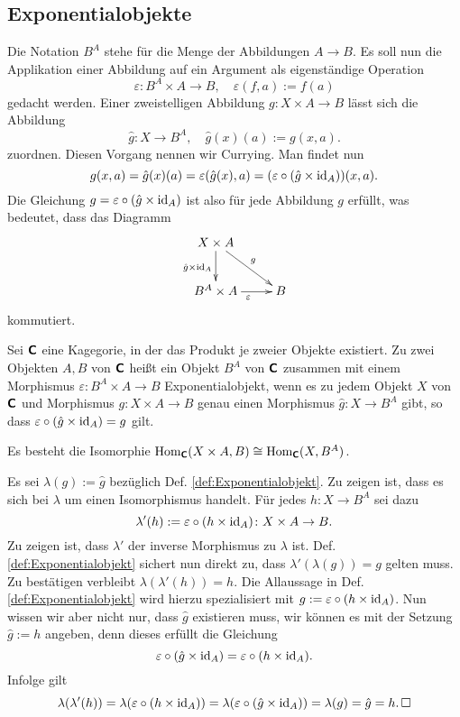 \subsection{Exponentialobjekte}

Die Notation $B^A$ stehe für die Menge der Abbildungen $A\to B$.
Es soll nun die Applikation einer Abbildung auf ein Argument
als eigenständige Operation
\[\varepsilon\colon B^A\times A \to B,\quad
\varepsilon(f,a) := f(a)\]
gedacht werden. Einer zweistelligen Abbildung
$g\colon X\times A\to B$ lässt sich die Abbildung
\[\hat g\colon X\to B^A,\quad \hat g(x)(a) := g(x,a).\]
zuordnen. Diesen Vorgang nennen wir Currying. Man findet nun
\[g(x,a) = \hat g(x)(a) = \varepsilon(\hat g(x),a)
= (\varepsilon\circ (\hat g\times\operatorname{id}_A))(x,a).\]
Die Gleichung $g = \varepsilon\circ(\hat g\times\operatorname{id}_A)$ ist also
für jede Abbildung $g$ erfüllt, was bedeutet, dass das Diagramm
\[\xymatrix{
X\times A\ar[dr]^g\ar[d]_{\hat g\times\id_A} & \\
B^A\times A \ar[r]_{\varepsilon} & B
}\]
kommutiert.

\begin{Definition}[Exponentialobjekt]%
\label{def:Exponentialobjekt}\newlinefirst
Sei $\textsf{\textbf{C}}$ eine Kagegorie, in der das Produkt je zweier Objekte
existiert. Zu zwei Objekten $A,B$ von $\textsf{\textbf{C}}$ heißt ein
Objekt $B^A$ von $\textsf{\textbf{C}}$ zusammen mit einem Morphismus
$\varepsilon\colon B^A\times A\to B$ Exponentialobjekt, wenn es zu jedem
Objekt $X$ von $\textsf{\textbf{C}}$ und Morphismus $g\colon X\times A\to B$
genau einen Morphismus $\hat g\colon X\to B^A$ gibt, so dass
$\varepsilon\circ (\hat g\times\operatorname{id}_A) = g$ gilt.
\end{Definition}

\begin{Satz}\label{Exp-Isomorphie}
Es besteht die Isomorphie
$\operatorname{Hom}_{\textsf{\textbf{C}}}(X\times A, B)\cong\operatorname{Hom}_{\textsf{\textbf{C}}}(X,B^A)$.
\end{Satz}

\noindent{} Es sei $\lambda(g):=\hat g$ bezüglich Def.
\ref{def:Exponentialobjekt}. Zu zeigen ist, dass es sich bei $\lambda$
um einen Isomorphismus handelt. Für jedes $h\colon X\to B^A$ sei dazu
\[\lambda'(h) := \varepsilon\circ (h\times\operatorname{id}_{A})\colon X\times A\to B.\]
Zu zeigen ist, dass $\lambda'$ der inverse Morphismus zu $\lambda$ ist.
Def. \ref{def:Exponentialobjekt} sichert nun direkt zu, dass
$\lambda'(\lambda(g)) = g$ gelten muss. Zu bestätigen verbleibt
$\lambda(\lambda'(h)) = h$. Die Allaussage in Def. \ref{def:Exponentialobjekt}
wird hierzu spezialisiert mit $g:=\varepsilon\circ (h\times\operatorname{id}_A)$.
Nun wissen wir aber nicht nur, dass $\hat g$ existieren muss, wir
können es mit der Setzung $\hat g:=h$ angeben, denn dieses erfüllt die
Gleichung
\[\varepsilon\circ (\hat g\times\operatorname{id}_A) = \varepsilon\circ (h\times\operatorname{id}_A).\]
Infolge gilt
\[\lambda(\lambda'(h)) = \lambda(\varepsilon\circ (h\times\operatorname{id}_A))
= \lambda(\varepsilon\circ (\hat g\times\operatorname{id}_A))
= \lambda(g) = \hat g = h.\,\Box\]

